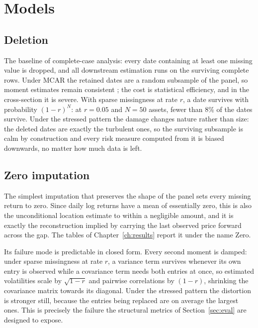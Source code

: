 \section{Models}
\label{sec:models}

\subsection{Deletion}

The baseline of complete-case analysis: every date containing at least one
missing value is dropped, and all downstream estimation runs on the surviving
complete rows. Under MCAR the retained dates are a random subsample of the
panel, so moment estimates remain consistent \citep{little2019}; the cost is
statistical efficiency, and in the cross-section it is severe. With sparse
missingness at rate $r$, a date survives with probability $(1-r)^N$: at
$r=0.05$ and $N=50$ assets, fewer than $8\%$ of the dates survive. Under the
stressed pattern the damage changes nature rather than size: the deleted
dates are exactly the turbulent ones, so the surviving subsample is calm by
construction and every risk measure computed from it is biased downwards, no
matter how much data is left.

\subsection{Zero imputation}
\label{sec:zero}

The simplest imputation that preserves the shape of the panel sets every missing
return to zero. Since daily log returns have a mean of essentially zero, this is
also the unconditional location estimate to within a negligible amount, and it is
exactly the reconstruction implied by carrying the last observed price forward
across the gap. The tables of Chapter~\ref{ch:results} report it under the name
Zero.

Its failure mode is predictable in closed form. Every second moment is damped:
under sparse missingness at rate $r$, a variance term survives whenever its own
entry is observed while a covariance term needs both entries at once, so
estimated volatilities scale by $\sqrt{1-r}$ and pairwise correlations by
$(1-r)$, shrinking the covariance matrix towards its diagonal. Under the stressed
pattern the distortion is stronger still, because the entries being replaced are
on average the largest ones. This is precisely the failure the structural metrics
of Section~\ref{sec:eval} are designed to expose.

